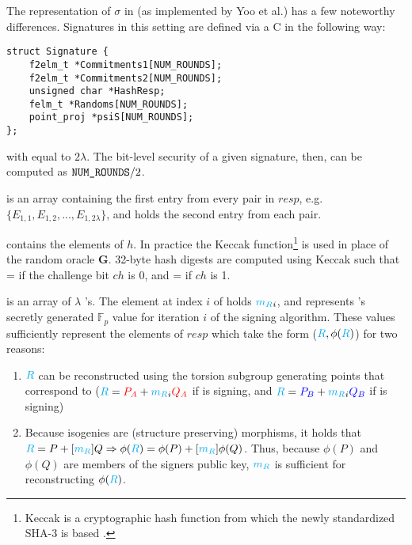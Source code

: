 \vspace{10px}
\noindent
The representation of $\sigma$ in \sidh (as implemented by Yoo et al.) has a few noteworthy differences. Signatures in this setting are defined via a C  in the following way:\\

\begin{lstlisting}
struct Signature {
	f2elm_t *Commitments1[NUM_ROUNDS];
	f2elm_t *Commitments2[NUM_ROUNDS];
	unsigned char *HashResp;
	felm_t *Randoms[NUM_ROUNDS];
	point_proj *psiS[NUM_ROUNDS];
};
\end{lstlisting}
\vspace{15px}

with  equal to $2\lambda$. The bit-level security of a given signature, then, can be computed as $\texttt{NUM\_ROUNDS}/2$.

 is an array containing the first entry from every pair in $resp$, e.g.\ $\{E_{1,1}, E_{1,2}, ..., E_{1,2\lambda}\}$, and  holds the second entry from each pair.

 contains the elements of $h$. In practice the Keccak function\footnote{Keccak is a cryptographic hash function from which the newly standardized SHA-3 is based \cite{sha3}.} is used in place of the random oracle \textbf{G}. 32-byte hash digests are computed using Keccak such that  =  if the challenge bit $ch$ is 0, and  =  if $ch$ is 1.

 is an array of $\lambda$ 's. The element at index $i$ of  holds $\textcolor{cyan}{m_R}_{i}$, and represents \randall's secretly generated $\mathbb{F}_{p}$ value for iteration $i$ of the signing algorithm. These values sufficiently represent the elements of $resp$ which take the form ($\textcolor{cyan}{R}, \phi(\textcolor{cyan}{R})$) for two reasons:
\begin{enumerate}
\item $\textcolor{cyan}{R}$ can be reconstructed using the torsion subgroup generating points that correspond to \randall ($\textcolor{cyan}{R} = \textcolor{red}{P_A} + \textcolor{cyan}{m_R}_{i}\textcolor{red}{Q_A}$ if \bob is signing, and $\textcolor{cyan}{R} = \textcolor{blue}{P_B} + \textcolor{cyan}{m_R}_{i}\textcolor{blue}{Q_B}$ if \alice is signing)
\item Because isogenies are (structure preserving) morphisms, it holds that $\textcolor{cyan}{R} = P + [\textcolor{cyan}{m_R}]Q \Rightarrow \phi(\textcolor{cyan}{R}) = \phi(P) + [\textcolor{cyan}{m_R}]\phi(Q)$. Thus, because $\phi(P)$ and $\phi(Q)$ are members of the signers public key, $\textcolor{cyan}{m_R}$ is sufficient for reconstructing $\phi(\textcolor{cyan}{R})$.
\end{enumerate}

